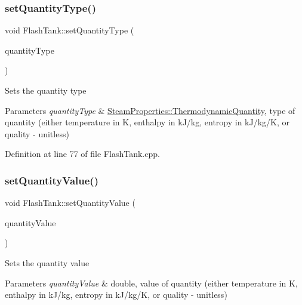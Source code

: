 \subsubsection{\texorpdfstring{set\+Quantity\+Type()}{setQuantityType()}\hspace{0.1cm}{\footnotesize\ttfamily [3/3]}}
{\footnotesize\ttfamily void Flash\+Tank\+::set\+Quantity\+Type (\begin{DoxyParamCaption}\item[{\hyperlink{class_steam_properties_ae0294bedf7d178c2d8fb6aed0f62fbff}{Steam\+Properties\+::\+Thermodynamic\+Quantity}}]{quantity\+Type }\end{DoxyParamCaption})}

Sets the quantity type 
\begin{DoxyParams}{Parameters}
{\em quantity\+Type} & \hyperlink{class_steam_properties_ae0294bedf7d178c2d8fb6aed0f62fbff}{Steam\+Properties\+::\+Thermodynamic\+Quantity}, type of quantity (either temperature in K, enthalpy in k\+J/kg, entropy in k\+J/kg/K, or quality -\/ unitless) \\
\hline
\end{DoxyParams}


Definition at line 77 of file Flash\+Tank.\+cpp.

\mbox{\label{class_flash_tank_ac7392743aeaf8de6ce368814ea42e236}} 
\subsubsection{\texorpdfstring{set\+Quantity\+Value()}{setQuantityValue()}\hspace{0.1cm}{\footnotesize\ttfamily [1/3]}}
{\footnotesize\ttfamily void Flash\+Tank\+::set\+Quantity\+Value (\begin{DoxyParamCaption}\item[{double}]{quantity\+Value }\end{DoxyParamCaption})}

Sets the quantity value 
\begin{DoxyParams}{Parameters}
{\em quantity\+Value} & double, value of quantity (either temperature in K, enthalpy in k\+J/kg, entropy in k\+J/kg/K, or quality -\/ unitless) \\
\hline
\end{DoxyParams}
\mbox{\label{class_flash_tank_ac7392743aeaf8de6ce368814ea42e236}} 
